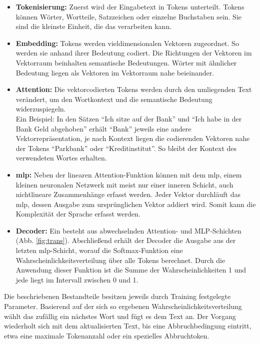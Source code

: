 \documentclass[../main.tex]{subfiles}
\begin{document}
\begin{itemize}

\item \textbf{Tokenisierung:} Zuerst wird der Eingabetext in Tokens unterteilt. Tokens können Wörter, Wortteile, Satzzeichen oder einzelne Buchstaben sein. Sie sind die kleinste Einheit, 
die das  verarbeiten kann.\cite{architecture}

\item \textbf{Embedding:} Tokens werden vieldimensionalen Vektoren zugeordnet. So werden sie anhand ihrer Bedeutung codiert. Die Richtungen der Vektoren im
Vektorraum beinhalten semantische Bedeutungen. Wörter mit ähnlicher Bedeutung liegen als Vektoren im Vektorraum nahe beieinander.\cite{embedding}

\item \textbf{Attention:} Die vektorcodierten Tokens werden durch den umliegenden Text verändert, um den Wortkontext und die semantische Bedeutung widerzuspiegeln.\\
Ein Beispiel: In den Sätzen "`Ich sitze auf der Bank"' und "`Ich habe in der Bank Geld abgehoben"' erhält "`Bank"' jeweils eine andere Vektorrepräsentation, je nach Kontext liegen die codierenden 
Vektoren nahe der Tokens "`Parkbank"' oder "`Kreditinstitut"'. So bleibt der Kontext des verwendeten Wortes erhalten.\cite{attention, attention2} 

\item \textbf{\acrfull{mlp}:} Neben der linearen Attention-Funktion können mit dem \acrshort{mlp}, einem kleinen neuronalen Netzwerk mit meist nur einer inneren Schicht, auch nichtlineare Zusammenhänge 
erfasst werden. Jeder Vektor durchläuft das \acrshort{mlp}, dessen Ausgabe zum ursprünglichen Vektor addiert wird. Somit kann die Komplexität der Sprache erfasst werden.

\item \textbf{Decoder:} Ein  besteht aus abwechselnden Attention- und MLP-Schichten (Abb. \ref{fig:trans}). Abschließend erhält der Decoder die Ausgabe aus der letzten 
\acrshort{mlp}-Schicht, worauf die Softmax-Funktion eine Wahrscheinlichkeitsverteilung über alle Tokens berechnet. Durch die Anwendung dieser Funktion ist die Summe der Wahrscheinlichkeiten 1 und jede liegt im Intervall zwischen 0 und 1.\cite{architecture} 
\end{itemize}

Die beschriebenen Bestandteile besitzen jeweils durch Training festgelegte Parameter. Basierend auf der sich so ergebenen Wahrscheinlichkeitsverteilung wählt das  zufällig ein nächstes Wort und fügt es dem Text an. Der Vorgang wiederholt sich mit dem aktualisierten Text, 
bis eine Abbruchbedingung eintritt, etwa eine maximale Tokenanzahl oder ein spezielles Abbruchtoken.\cite{architecture}\\
\end{document}

